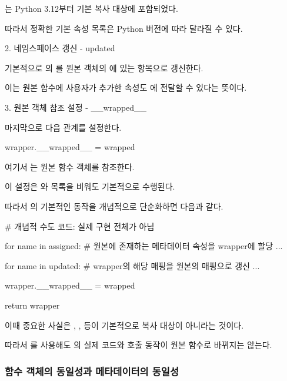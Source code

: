 는 Python 3.12부터 기본 복사 대상에 포함되었다.

따라서 정확한 기본 속성 목록은 Python 버전에 따라 달라질 수 있다.

\begin{dhknote}
\begin{dhksmry}[centered]
2. 네임스페이스 갱신 - updated
\end{dhksmry}
\end{dhknote}

기본적으로 의 를 원본 객체의 에 있는 항목으로 갱신한다.

이는 원본 함수에 사용자가 추가한 속성도 에 전달할 수 있다는 뜻이다.

\begin{dhknote}
\begin{dhksmry}[centered]
3. 원본 객체 참조 설정 - __wrapped__
\end{dhksmry}
\end{dhknote}

마지막으로 다음 관계를 설정한다.

\begin{dhkcode}
wrapper.__wrapped__ = wrapped
\end{dhkcode}

여기서 는 원본 함수 객체를 참조한다.

이 설정은 와  목록을 비워도 기본적으로 수행된다.

따라서 의 기본적인 동작을 개념적으로 단순화하면 다음과 같다.

\begin{dhkcode}
# 개념적 수도 코드: 실제 구현 전체가 아님

for name in assigned:
    # 원본에 존재하는 메타데이터 속성을 wrapper에 할당
    ...

for name in updated:
    # wrapper의 해당 매핑을 원본의 매핑으로 갱신
    ...

wrapper.__wrapped__ = wrapped

return wrapper
\end{dhkcode}

이때 중요한 사실은 , ,  등이 기본적으로 복사 대상이 아니라는 것이다.

따라서 를 사용해도 의 실제 코드와 호출 동작이 원본 함수로 바뀌지는 않는다.

\subsubsection{함수 객체의 동일성과 메타데이터의 동일성}

